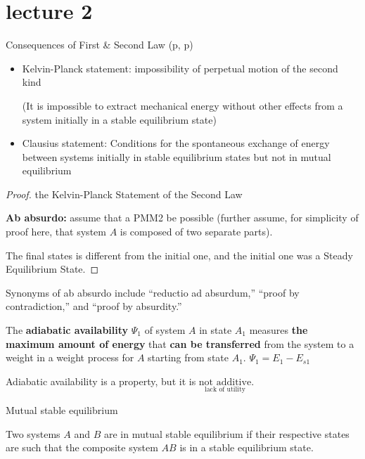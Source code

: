 \section{lecture 2}
\begin{thm}\label{cfsl1}
    Consequences of First \& Second Law (p\pageref{cfsl2}\;,\; p\pageref{cfsl3})
    \begin{itemize}
        \item Kelvin-Planck statement: impossibility of perpetual motion of the second kind
        
        (It is impossible to extract mechanical energy without other effects from a system initially in a stable equilibrium state)
        \item Clausius statement: Conditions for the spontaneous exchange of energy between systems initially in stable equilibrium states but not in mutual equilibrium
    \end{itemize}
\begin{proof}
    the Kelvin-Planck Statement of the Second Law

\textbf{Ab absurdo:} assume that a PMM2 be possible (further assume, for simplicity of proof here, 
that system \( A \) is composed of two separate parts).

The final states is different from the initial one, and the initial
one was a Steady Equilibrium State.
\end{proof}
\begin{zhu}
    Synonyms of ab absurdo include “reductio ad absurdum,” “proof by contradiction,” and “proof by absurdity.”
\end{zhu}
\end{thm}
\begin{defn}
    The \textbf{adiabatic availability} \( \Psi_1 \) of system \( A \) in state \( A_1 \) 
    measures \textbf{the maximum amount of energy} that \textbf{can be transferred} from the system 
    to a weight in a weight process for \( A \) starting from state \( A_1 \).
    \(\Psi_1=E_1-E_{s1}\)
\end{defn}
\begin{thm}
    Adiabatic availability is a property, but it is \(\underset{\text{lack of utility}}{\text{not additive}}\).
\end{thm}
\begin{defn}
    Mutual stable equilibrium
      
    Two systems \( A \) and \( B \) are in mutual stable equilibrium if their respective states are such that the composite system \( AB \) is in a stable equilibrium state.
\end{defn}
